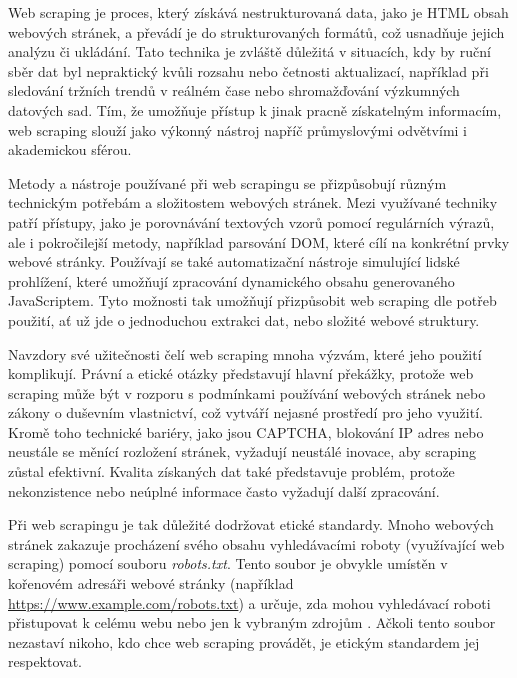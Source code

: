 Web scraping je proces, který získává nestrukturovaná data, jako je HTML obsah webových stránek, a převádí je do strukturovaných formátů, což usnadňuje jejich analýzu či ukládání.
Tato technika je zvláště důležitá v situacích, kdy by ruční sběr dat byl nepraktický kvůli rozsahu nebo četnosti aktualizací, například při sledování tržních trendů v reálném čase nebo shromažďování výzkumných datových sad.
Tím, že umožňuje přístup k jinak pracně získatelným informacím, web scraping slouží jako výkonný nástroj napříč průmyslovými odvětvími i akademickou sférou. \cite{inbook}

Metody a nástroje používané při web scrapingu se přizpůsobují různým technickým potřebám a složitostem webových stránek. Mezi využívané techniky patří přístupy, jako je porovnávání textových vzorů pomocí regulárních výrazů, ale i pokročilejší metody, například parsování DOM, které cílí na konkrétní prvky webové stránky.
Používají se také automatizační nástroje simulující lidské prohlížení, které umožňují zpracování dynamického obsahu generovaného JavaScriptem. \cite{inbook}
Tyto možnosti tak umožňují přizpůsobit web scraping dle potřeb použití, ať už jde o jednoduchou extrakci dat, nebo složité webové struktury.

Navzdory své užitečnosti čelí web scraping mnoha výzvám, které jeho použití komplikují.
Právní a etické otázky představují hlavní překážky, protože web scraping může být v rozporu s podmínkami používání webových stránek nebo zákony o duševním vlastnictví, což vytváří nejasné prostředí pro jeho využití.
Kromě toho technické bariéry, jako jsou CAPTCHA, blokování IP adres nebo neustále se měnící rozložení stránek, vyžadují neustálé inovace, aby scraping zůstal efektivní.
Kvalita získaných dat také představuje problém, protože nekonzistence nebo neúplné informace často vyžadují další zpracování. \cite{inbook}

Při web scrapingu je tak důležité dodržovat etické standardy.
Mnoho webových stránek zakazuje procházení svého obsahu vyhledávacími roboty (využívající web scraping) pomocí souboru \textit{robots.txt}.
Tento soubor je obvykle umístěn v kořenovém adresáři webové stránky (například \url{https://www.example.com/robots.txt}) a určuje, zda mohou vyhledávací roboti přistupovat k celému webu nebo jen k vybraným zdrojům \cite{mozillaRobotstxtDocs}.
Ačkoli tento soubor nezastaví nikoho, kdo chce web scraping provádět, je etickým standardem jej respektovat.

